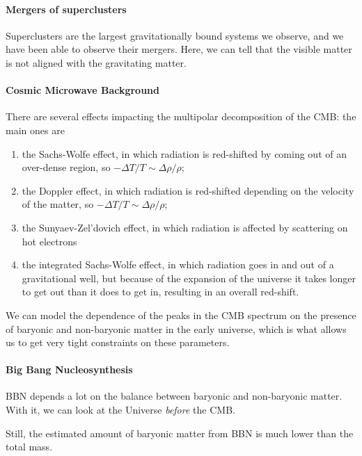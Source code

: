 \documentclass[main.tex]{subfiles}
\begin{document}
\paragraph{Mergers of superclusters}

Superclusters are the largest gravitationally bound systems we observe, and 
we have been able to observe their mergers. 
Here, we can tell that the visible matter is not aligned with the gravitating matter. 

\paragraph{Cosmic Microwave Background}

There are several effects impacting the multipolar decomposition of the CMB: 
the main ones are 
\begin{enumerate}
    \item the Sachs-Wolfe effect, in which radiation is red-shifted 
    by coming out of an over-dense region, so \(-\Delta T / T \sim \Delta \rho / \rho \);
    \item the Doppler effect, in which radiation is red-shifted depending on
    the velocity of the matter, so \(- \Delta T / T \sim \Delta \rho / \rho \);
    \item the Sunyaev-Zel'dovich effect, in which radiation is affected by 
    scattering on hot electrons
    \item the integrated Sachs-Wolfe effect, in which radiation goes in and out
    of a gravitational well, but because of the expansion of the universe it takes 
    longer to get out than it does to get in, resulting in an overall red-shift. 
\end{enumerate}

We can model the dependence of the peaks in the CMB spectrum on the presence of
baryonic and non-baryonic matter in the early universe, which is what allows us to get 
very tight constraints on these parameters.

\paragraph{Big Bang Nucleosynthesis}

BBN depends a lot on the balance between baryonic and non-baryonic matter.
With it, we can look at the Universe \emph{before} the CMB. 

Still, the estimated amount of baryonic matter from BBN is much lower 
than the total mass. 
\end{document}
